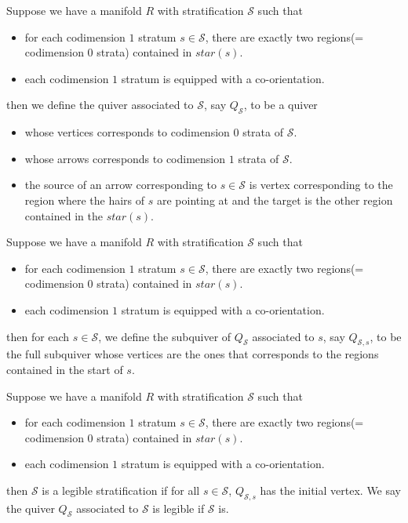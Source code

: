 \begin{definition}
Suppose we have a manifold $R$ with stratification $\mathcal{S}$ such that
\begin{itemize}
\item for each codimension $1$ stratum $s\in \mathcal{S}$, there are exactly two regions(= codimension $0$ strata) contained in $star(s)$.

\item each codimension $1$ stratum is equipped with a co-orientation.
\end{itemize}
then we define the quiver associated to $\mathcal{S}$, say $Q_{\mathcal{S}}$, to be a quiver
\begin{itemize}
\item whose vertices corresponds to codimension $0$ strata of $\mathcal{S}$.

\item whose arrows corresponds to codimension $1$ strata of $\mathcal{S}$.

\item the source of an arrow corresponding to $s\in \mathcal{S}$ is  vertex corresponding to the region where the hairs of $s$ are pointing at and the target is the other region contained in the $star(s)$.
\end{itemize}
\end{definition}

\begin{definition}
Suppose we have a manifold $R$ with stratification $\mathcal{S}$ such that
\begin{itemize}
\item for each codimension $1$ stratum $s\in \mathcal{S}$, there are exactly two regions(= codimension $0$ strata) contained in $star(s)$.

\item each codimension $1$ stratum is equipped with a co-orientation.
\end{itemize}
then for each $s\in \mathcal{S}$, we define the subquiver of $Q_{\mathcal{S}}$ associated to $s$, say $Q_{\mathcal{S},s}$, to be the full subquiver whose vertices are the ones that corresponds to the regions contained in the start of $s$.
\end{definition}

\begin{definition}
Suppose we have a manifold $R$ with stratification $\mathcal{S}$ such that
\begin{itemize}
\item for each codimension $1$ stratum $s\in \mathcal{S}$, there are exactly two regions(= codimension $0$ strata) contained in $star(s)$.

\item each codimension $1$ stratum is equipped with a co-orientation.
\end{itemize}
then $\mathcal{S}$ is a legible stratification if for all $s\in\mathcal{S}$, $Q_{\mathcal{S},s}$ has the initial vertex. We say the quiver $Q_{\mathcal{S}}$ associated to $\mathcal{S}$ is legible if $\mathcal{S}$ is.
\end{definition}

